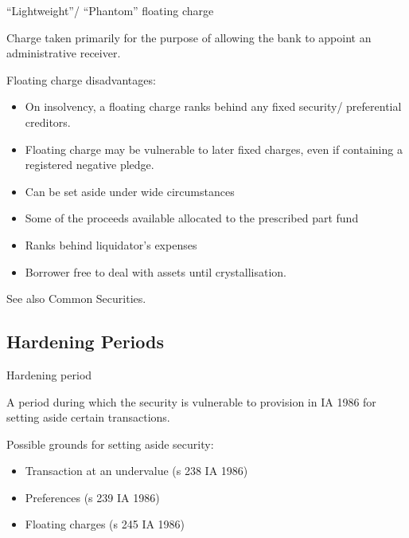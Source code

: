 \documentclass[
]{article}
\providecommand{\tightlist}{%
  \setlength{\itemsep}{0pt}\setlength{\parskip}{0pt}}
\newenvironment{env-8872a5c8-2356-4b38-87ff-b8a967f137b3}
{
    \savenotes\tcolorbox[blanker,breakable,left=5pt,borderline west={2pt}{-4pt}{yellow}]
}
{
    \endtcolorbox\spewnotes
}
\begin{document}
\begin{env-8872a5c8-2356-4b38-87ff-b8a967f137b3}

``Lightweight''/ ``Phantom'' floating charge

Charge taken primarily for the purpose of allowing the bank to appoint
an administrative receiver.

\end{env-8872a5c8-2356-4b38-87ff-b8a967f137b3}

Floating charge disadvantages:

\begin{itemize}
\tightlist
\item
  On insolvency, a floating charge ranks behind any fixed security/
  preferential creditors.
\item
  Floating charge may be vulnerable to later fixed charges, even if
  containing a registered negative pledge.
\item
  Can be set aside under wide circumstances
\item
  Some of the proceeds available allocated to the prescribed part fund
\item
  Ranks behind liquidator's expenses
\item
  Borrower free to deal with assets until crystallisation.
\end{itemize}

See also Common Securities.

\hypertarget{hardening-periods}{%
\subsection{Hardening Periods}\label{hardening-periods}}

\begin{env-8872a5c8-2356-4b38-87ff-b8a967f137b3}

Hardening period

A period during which the security is vulnerable to provision in IA 1986
for setting aside certain transactions.

\end{env-8872a5c8-2356-4b38-87ff-b8a967f137b3}

Possible grounds for setting aside security:

\begin{itemize}
\tightlist
\item
  Transaction at an undervalue (s 238 IA 1986)
\item
  Preferences (s 239 IA 1986)
\item
  Floating charges (s 245 IA 1986)
\end{itemize}
\end{document}
